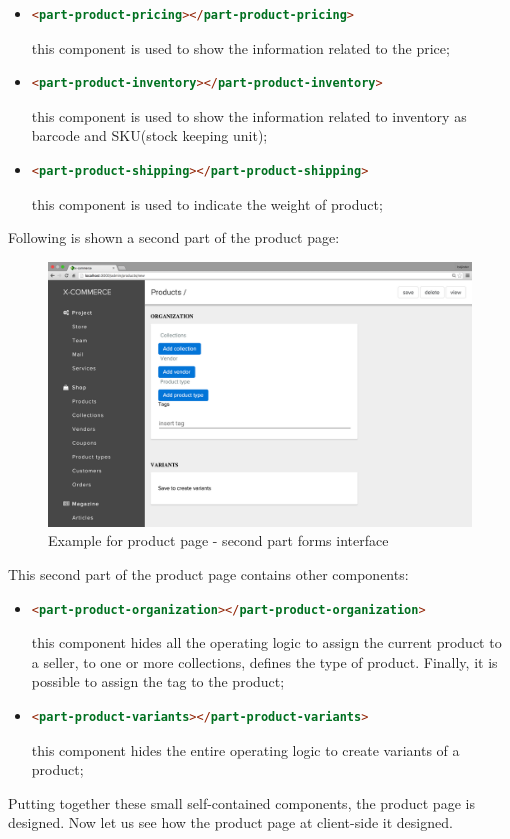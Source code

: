 \begin{itemize}
\item
\begin{lstlisting}[language=html]
<part-product-pricing></part-product-pricing>
\end{lstlisting}
this component is used to show the information related to the price;
\item
\begin{lstlisting}[language=html]
<part-product-inventory></part-product-inventory>
\end{lstlisting}
this component is used to show the information related to inventory as barcode and SKU(stock keeping unit);
\item
\begin{lstlisting}[language=html]
<part-product-shipping></part-product-shipping>
\end{lstlisting}
this component is used to indicate the weight of product;
\end{itemize}

Following is shown a second part of the product page:
\begin{figure}[htb]
\centering
\includegraphics[width=1.0\linewidth]{images/chapter4/product-page-ex2.png}\hfill
\caption[Product page second part form]{Example for product page - second part forms interface}
\label{fig:design_page}
\end{figure}
This second part of the product page contains other components:
\begin{itemize}
\item
\begin{lstlisting}[language=html]
<part-product-organization></part-product-organization>
\end{lstlisting}
this component hides all the operating logic to assign the current product to a seller, to one or more collections, defines the type of product. Finally, it is possible to assign the tag to the product;
\item
\begin{lstlisting}[language=html]
<part-product-variants></part-product-variants>
\end{lstlisting}
this component hides the entire operating logic to create variants of a product;
\end{itemize}
Putting together these small self-contained components, the product page is designed. Now let us see how the product page at client-side it designed.
